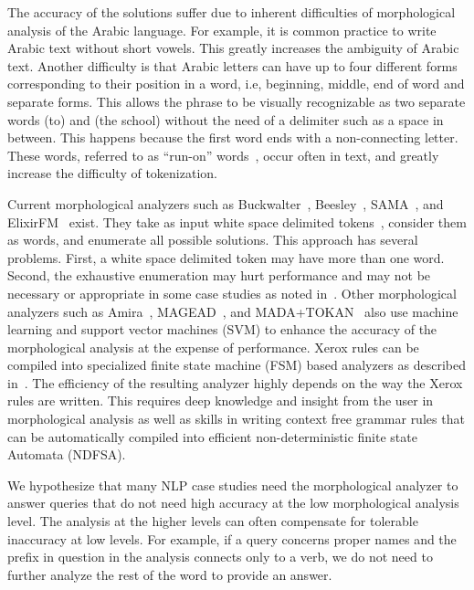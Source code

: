 \documentclass[11pt]{article}
\begin{document}
\novocalize
The accuracy of the solutions suffer due to inherent difficulties
of morphological analysis of the Arabic language. 
For example, it is common practice to write Arabic text
without short vowels. 
This greatly increases the ambiguity of Arabic text. 
Another difficulty is that  Arabic letters can have up to 
four different forms
corresponding to their position in a word, i.e, beginning,
middle, end of word and separate forms. 
This allows the phrase \transfalse
{} \transtrue
to be visually recognizable
as two separate words  (to) and  (the school) 
without the need of a delimiter such as a space in between. 
This happens because the first word  ends with
 a non-connecting letter. 
These words,
referred to as ``run-on'' words~\cite{Buckwalter:04},
occur often in text, and greatly increase the
difficulty of tokenization.

Current morphological analyzers such as 
Buckwalter~,
Beesley~,
SAMA~\cite{Kulick:10},
and ElixirFM~\cite{Otakar:07} exist.
They take as input white space delimited tokens~\cite{Kulick:10},
consider them as words,
and enumerate all possible solutions. 
This approach has several problems. 
First, a white space delimited token may have 
more than one word.
Second, the exhaustive enumeration may hurt performance and may
not be necessary or appropriate
in some case studies as noted in~\cite{Maamouri:10}. 
Other morphological analyzers such as 
Amira~\cite{Diab:07,Benajiba:07},
MAGEAD~\cite{Habash:05}, and MADA+TOKAN~\cite{Habash:09} 
also use machine learning and support vector machines (SVM) 
to enhance the accuracy of the morphological analysis at the expense 
of performance.
Xerox rules can be compiled into specialized finite state
machine (FSM) based analyzers as described in~\cite{Beesley:03}.
The efficiency of the resulting analyzer highly depends on the
way the Xerox rules are written. 
This requires deep knowledge and insight from the user
in morphological analysis as well as skills in writing 
context free grammar rules that can be automatically compiled
into efficient non-deterministic finite state Automata (NDFSA). 

We hypothesize that many NLP case studies need the 
morphological analyzer to answer queries that do not need 
high accuracy at the low morphological analysis level.
The analysis at the higher levels can often compensate for 
tolerable inaccuracy at low levels. 
For example, if a query concerns proper names and the 
prefix in question in the analysis connects only to a verb, 
we do not need to further analyze the rest of the word 
to provide an answer.
\end{document}
